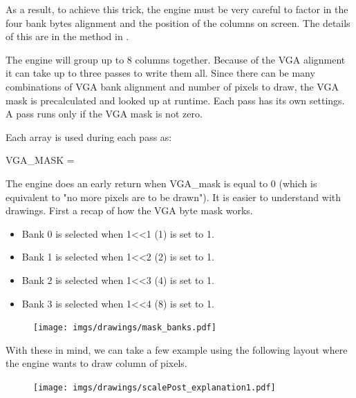As a result, to achieve this trick, the engine must be very careful to factor in the four bank bytes alignment and the position of the columns on screen. The details of this are in the method  in .\\
\par 
\begin{minipage}{\textwidth}

\end{minipage}
The engine will group up to 8 columns together. Because of the VGA alignment it can take up to three passes to write them all. Since there can be many combinations of VGA bank alignment and number of pixels to draw, the VGA mask is precalculated and looked up at runtime. Each pass has its own settings. A pass runs only if the VGA mask is not zero.\\

 \par
 \begin{minipage}{\textwidth}

\end{minipage}
Each  array is used during each pass  as:\\
\par
 VGA\_MASK = \\
 \par
 The engine does an early return when VGA\_mask is equal to 0 (which is equivalent to "no more pixels are to be drawn"). It is easier to understand with drawings. First a recap of how the VGA byte mask works.
\begin{itemize}
\item Bank 0 is selected when 1<<1 (1) is set to 1.
\item Bank 1 is selected when 1<<2 (2) is set to 1.
\item Bank 2 is selected when 1<<3 (4) is set to 1.
\item Bank 3 is selected when 1<<4 (8) is set to 1.
\end{itemize}
\par


\begin{figure}[H]
\centering
 \texttt{[image: imgs/drawings/mask\_banks.pdf]}
 \end{figure}


With these in mind, we can take a few example using the following layout where the engine wants to draw column of pixels.
\begin{figure}[H]
\centering
 \texttt{[image: imgs/drawings/scalePost\_explanation1.pdf]}
 \end{figure}


